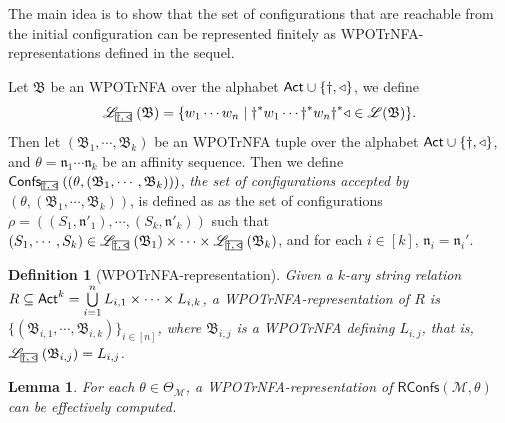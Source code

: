 \documentclass[preprint,12pt]{elsarticle}
\newcommand\rectangled[1]{\tikz[baseline=(torect.base)]{
    \node[shape = rectangle, draw, inner sep=0pt, outer sep = 0pt] (torect) {#1}
    }
}
\newcommand{\mrectangled}[1]{\text{\rectangled{\ensuremath{#1}}}}
\newcommand{\mhcancel}[1]{\mrectangled{#1}}
\newtheorem{definition}{Definition}
\newtheorem{lemma}[theorem]{Lemma}
\newcommand\Mm{{\mathcal{M} }}
\newcommand\act{{\sf Act}}
\newcommand{\AMASS}{\textsf{ASM}}
\newcommand\confs{{\mathsf{Confs} }}
\newcommand\conf{{\mathsf{Conf} }}
\newcommand\aname{\mathfrak{n}}
\newcommand\RConfs{\mathsf{RConfs}}
\newcommand\Aut{{\mathfrak{A} }}
\newcommand\AutB{{\mathfrak{B} }}
\newcommand\Lang{{\mathscr{L} }}
\newcommand{\WOTrPDS}{\textsf{WPOTrPDS}}
\newcommand{\WOTrNFA}{\textsf{WPOTrNFA}}
\begin{document}
{The main idea is to show that the set of configurations that are reachable from the initial configuration can be represented finitely as {\WOTrNFA}-representations defined in the sequel. 

Let $\AutB$ be an {\WOTrNFA} over the alphabet $\act\cup\{\dag, \triangleleft\}$, we define 
$$\Lang_{\mhcancel{\dag, \triangleleft}}(\AutB) = \{w_1\cdots w_n\mid \dag^*w_1\cdots\dag^*w_n\dag^*\triangleleft\in\Lang(\AutB)\}.$$
Then let $(\AutB_1,\cdots,\AutB_k)$ be an {\WOTrNFA} tuple over the alphabet $\act\cup\{\dag, \triangleleft\}$, 
and $\theta = \aname_1\cdots\aname_k$ be an affinity sequence. Then we define $\confs_{\mhcancel{\dag,\triangleleft}}((\theta, (\AutB_1,\cdots,\AutB_k)))$, \emph{the set of configurations accepted by $(\theta, (\AutB_1,\cdots,\AutB_k))$}, is defined as as the set of configurations $\rho = ((S_1,\aname'_1),\cdots,(S_k,\aname'_k))$  such that $(S_1, \cdots, S_k) \in \Lang_{\mhcancel{\dag,\triangleleft}}(\AutB_1)\times\cdots\times\Lang_{\mhcancel{\dag,\triangleleft}}(\AutB_k)$, and for each $i \in [k]$, $\aname_i=\aname_i'$.

\begin{definition}[{\WOTrNFA}-representation]
    Given a $k$-ary string relation $R\subseteq\act^k = \bigcup \limits_{i =1 }^n L_{i,1} \times \cdots \times L_{i, k}$, a {\WOTrNFA}-representation of $R$ is $\{(\AutB_{i,1},\cdots,\AutB_{i,k})\}_{i\in[n]}$, where $\AutB_{i,j}$ is a {\WOTrNFA} defining $L_{i,j}$, that is, $\Lang_{\mhcancel{\dag,\triangleleft}}(\AutB_{i,j}) = L_{i,j}$.
\end{definition}
}
    
    \begin{lemma}\label{lem:amass-recog}
        For each $\theta \in \Theta_\Mm$, a {\WOTrNFA}-representation of $\RConfs(\Mm, \theta)$ can be effectively computed.
    \end{lemma} 
\end{document}
